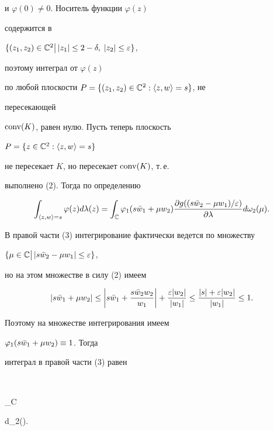 и $\varphi(0)\ne 0$. Носитель функции $\varphi(z)$ 


содержится в 


$\{(z_1,z_2)\in\Bbb C^2\bigl|\,\bigr.|z_1|\le 2-\delta,\; 


|z_2|\le\varepsilon\}$, 


поэтому интеграл от $\varphi(z)$ 


по любой плоскости $P=\{(z_1,z_2)\in\Bbb C^2:\langle z,w\rangle=s\}$, не 


пересекающей 


$\operatorname{conv}(K)$, равен нулю. Пусть теперь плоскость 


$P=\{z\in\Bbb C^2:\langle z,w\rangle=s\}$ 


не пересекает $K$, но пересекает $\operatorname{conv}(K)$, т.\,е. 


выполнено (2). Тогда по определению 


\begin{equation} 


\int_{\la z,w\ra=s}\varphi(z)d\lambda(z) 


=\int_{\Bbb C}\varphi_1(s\Bar w_1+\mu w_2) 


\frac{\partial g((s\Bar w_2-\mu w_1)/\varepsilon)}{\partial\lambda} 


d\omega_2(\mu). 


\end{equation} 


В правой части (3) интегрирование фактически ведется по множеству 


$\{\mu\in\Bbb C\bigl|\,\bigr.|s\Bar w_2-\mu w_1|\le\varepsilon\}$, 


но на этом множестве в силу (2) имеем 


$$ 


|s\Bar w_1+\mu w_2|\le \biggl|s\Bar w_1+ 


\frac{s\Bar w_2 w_2}{w_1}\biggr|+ 


\frac{\varepsilon|w_2|}{|w_1|}\le 


\frac{|s|+\varepsilon|w_2|}{|w_1|}\le 1. 


$$ 


Поэтому на множестве интегрирования имеем 


$\varphi_1(s\Bar w_1+\mu w_2)\equiv 1$. Тогда 


интеграл в правой части (3) равен 


$$ 


\int_{\Bbb C} 


{\partial\lambda}d\omega_2(\mu). 


